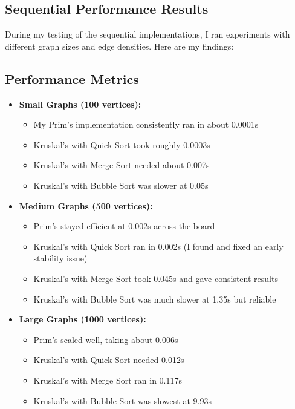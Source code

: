 \documentclass[11pt]{article}
\begin{document}
\subsection{Sequential Performance Results}

During my testing of the sequential implementations, I ran experiments with different graph sizes and edge densities. Here are my findings:

\subsection{Performance Metrics}
\begin{itemize}
    \item \textbf{Small Graphs (100 vertices):}
    \begin{itemize}
        \item My Prim's implementation consistently ran in about 0.0001s
        \item Kruskal's with Quick Sort took roughly 0.0003s
        \item Kruskal's with Merge Sort needed about 0.007s
        \item Kruskal's with Bubble Sort was slower at 0.05s
    \end{itemize}
    
    \item \textbf{Medium Graphs (500 vertices):}
    \begin{itemize}
        \item Prim's stayed efficient at 0.002s across the board
        \item Kruskal's with Quick Sort ran in 0.002s (I found and fixed an early stability issue)
        \item Kruskal's with Merge Sort took 0.045s and gave consistent results
        \item Kruskal's with Bubble Sort was much slower at 1.35s but reliable
    \end{itemize}
    
    \item \textbf{Large Graphs (1000 vertices):}
    \begin{itemize}
        \item Prim's scaled well, taking about 0.006s
        \item Kruskal's with Quick Sort needed 0.012s
        \item Kruskal's with Merge Sort ran in 0.117s
        \item Kruskal's with Bubble Sort was slowest at 9.93s
    \end{itemize}
\end{itemize}
\end{document}

